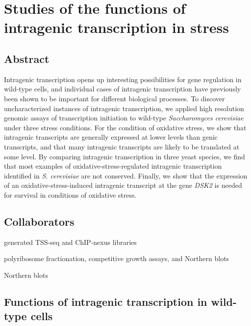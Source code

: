 \chapter{Studies of the functions of intragenic transcription in stress}
\label{chapter:stress}

\section{Abstract}

Intragenic transcription opens up interesting possibilities for gene regulation in wild-type cells, and individual cases of intragenic transcription have previously been shown to be important for different biological processes.
To discover uncharacterized instances of intragenic transcription, we applied high resolution genomic assays of transcription initiation to wild-type \textit{Saccharomyces cerevisiae} under three stress conditions.
For the condition of oxidative stress, we show that intragenic transcripts are generally expressed at lower levels than genic transcripts, and that many intragenic transcripts are likely to be translated at some level.
By comparing intragenic transcription in three yeast species, we find that most examples of oxidative-stress-regulated intragenic transcription identified in \textit{S. cerevisiae} are not conserved.
Finally, we show that the expression of an oxidative-stress-induced intragenic transcript at the gene \textit{DSK2} is needed for survival in conditions of oxidative stress.

\clearpage

\section{Collaborators}

\begin{description}[align=right, labelwidth=5cm, noitemsep, leftmargin=!]
    \item [Steve Doris] generated TSS-seq and ChIP-nexus libraries
    \item [Dan Spatt] polyribosome fractionation, competitive growth assays, and Northern blots
    \item [James Warner] Northern blots
\end{description}

\section{Functions of intragenic transcription in wild-type cells}

